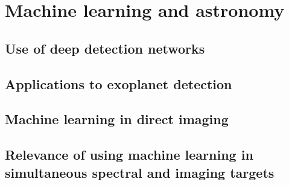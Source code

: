 \chapter{Machine learning and astronomy}
\section{Use of deep detection networks}
\section{Applications to exoplanet detection}
\section{Machine learning in direct imaging}
\section{Relevance of using machine learning in simultaneous spectral and imaging targets}